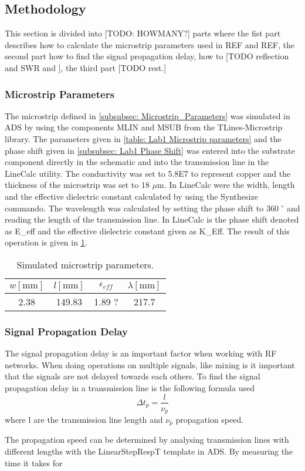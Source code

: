 \documentclass[report.tex]{subfiles}
\begin{document}
\subsection{Methodology}
This section is divided into [TODO: HOWMANY?] parts where the fist part describes how to calculate the microstrip parameters used in REF and REF, the second part how to find the signal propagation delay, how to [TODO reflection and SWR and ], the third part [TODO rest.]
\subsubsection{Microstrip Parameters}
The microstrip defined in \ref{subsubsec: Microstrip_Parameters} was simulated in ADS by using the components MLIN and MSUB from the TLines-Microstrip library. The parameters given in \ref{table: Lab1 Microstrip parameters} and the phase shift given in \ref{subsubsec: Lab1 Phase Shift} was entered into the substrate component directly in the schematic and into the transmission line in the LineCalc utility. The conductivity was set to 5.8E7 to represent copper and the thickness of the microstrip was set to 18 $\mu$m. In LineCalc were the width, length and the effective dielectric constant calculated by using the Synthesize commando. The wavelength was calculated by setting the phase shift to 360 $^\circ$ and reading the length of the transmission line. In LineCalc is the phase shift denoted as E\_eff and the effective dielectric constant given as K\_Eff. The result of this operation is given in \ref{table: Lab1 Simulated Microstrip parameters}.

\begin{table}[H]\label{table: Lab1 Simulated Microstrip parameters}
    \centering
    \caption{Simulated microstrip parameters.}
    \begin{tabular}{c | c | c | c}
        $w [\text{mm}]$ & $l [\text{mm}]$ & $\epsilon_{eff}$ & $\lambda [\text{mm}]$\\
        \hline
		2.38 & 149.83 & 1.89 ? & 217.7
    \end{tabular}
\end{table}

\subsubsection{Signal Propagation Delay}
The signal propagation delay is an important factor when working with RF networks. When doing operations on multiple signals, like mixing is it important that the signals are not delayed towards each others. To find the signal propagation delay in a transmission line is the following formula used
\begin{equation}
	\Delta t_p = \dfrac{l}{\nu_p}
\end{equation}
where l are the transmission line length and $\nu_p$ propagation speed.

The propagation speed can be determined by analysing transmission lines with different lengths with the LinearStepRespT template in ADS. By measuring the time it takes for
\end{document}
